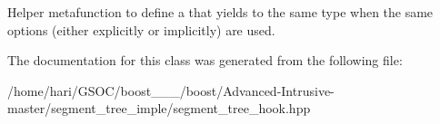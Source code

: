 Helper metafunction to define a { that} yields to the same type when the same options (either explicitly or implicitly) are used. 

The documentation for this class was generated from the following file\+:\begin{DoxyCompactItemize}
\item 
/home/hari/\+G\+S\+O\+C/boost\+\_\+\_\+\_/boost/\+Advanced-\/\+Intrusive-\/master/segment\+\_\+tree\+\_\+imple/segment\+\_\+tree\+\_\+hook.\+hpp\end{DoxyCompactItemize}
